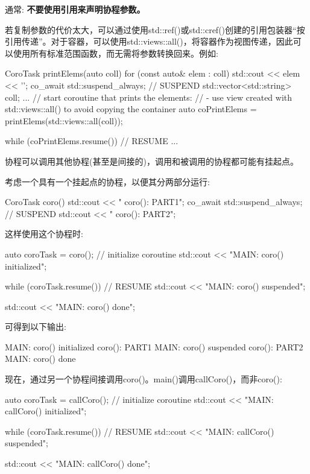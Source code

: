 通常: \textbf{不要使用引用来声明协程参数。}

若复制参数的代价太大，可以通过使用std::ref()或std::cref()创建的引用包装器“按引用传递”。对于容器，可以使用std::views::all()，将容器作为视图传递，因此可以使用所有标准范围函数，而无需将参数转换回来。例如:

\begin{cpp}
CoroTask printElems(auto coll)
{
	for (const auto& elem : coll) {
		std::cout << elem << '\n';
		co_await std::suspend_always{}; // SUSPEND
	}
}
std::vector<std::string> coll;
...
// start coroutine that prints the elements:
// - use view created with std::views::all() to avoid copying the container
auto coPrintElems = printElems(std::views::all(coll));

while (coPrintElems.resume()) { // RESUME
...
}
\end{cpp}


协程可以调用其他协程(甚至是间接的)，调用和被调用的协程都可能有挂起点。

考虑一个具有一个挂起点的协程，以便其分两部分运行:

\begin{cpp}
CoroTask coro()
{
	std::cout << " coro(): PART1\n";
	co_await std::suspend_always{}; // SUSPEND
	std::cout << " coro(): PART2\n";
}
\end{cpp}

这样使用这个协程时:

\begin{cpp}
auto coroTask = coro(); // initialize coroutine
std::cout << "MAIN: coro() initialized\n";

while (coroTask.resume()) { // RESUME
	std::cout << "MAIN: coro() suspended\n";
}

std::cout << "MAIN: coro() done\n";
\end{cpp}

可得到以下输出:

\begin{shell}
MAIN: coro() initialized
    coro(): PART1
MAIN: coro() suspended
    coro(): PART2
MAIN: coro() done
\end{shell}

现在，通过另一个协程间接调用coro()。main()调用callCoro()，而非coro():

\begin{cpp}
auto coroTask = callCoro(); // initialize coroutine
std::cout << "MAIN: callCoro() initialized\n";

while (coroTask.resume()) { // RESUME
	std::cout << "MAIN: callCoro() suspended\n";
}

std::cout << "MAIN: callCoro() done\n";
\end{cpp}

